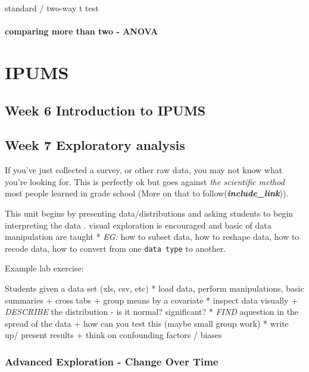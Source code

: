 \documentclass[
]{book}
\begin{document}
standard / two-way t test

\hypertarget{comparing-more-than-two---anova}{%
\subsubsection{comparing more than two - ANOVA}\label{comparing-more-than-two---anova}}

\hypertarget{unit2}{%
\chapter{IPUMS}\label{unit2}}

\hypertarget{week-6-introduction-to-ipums}{%
\section{Week 6 Introduction to IPUMS}\label{week-6-introduction-to-ipums}}

\hypertarget{exploratory}{%
\section{Week 7 Exploratory analysis}\label{exploratory}}

If you've just collected a survey, or other raw data, you may not know what you're looking for. This is perfectly ok but goes against \emph{the scientific method} most people learned in grade school (More on that to follow(\textbf{\emph{include\_link}})).

This unit begins by presenting data/distributions and asking students to begin interpreting the data . visual exploration is encouraged and basic of data manipulation are taught
* \emph{EG:} how to subset data, how to reshape data, how to recode data, how to convert from one \texttt{data\ type} to another.

Example lab exercise:

Students given a data set (xls, csv, etc)
* load data, perform manipulations, basic summaries
+ cross tabs
+ group means by a covariate
* inspect data visually
+ \emph{DESCRIBE} the distribution - is it normal? significant?
* \emph{FIND} aquestion in the spread of the data
+ how can you test this (maybe small group work)
* write up/ present results
+ think on confounding factors / biases

\hypertarget{advanced-exploration---change-over-time}{%
\subsection{Advanced Exploration - Change Over Time}\label{advanced-exploration---change-over-time}}
\end{document}
